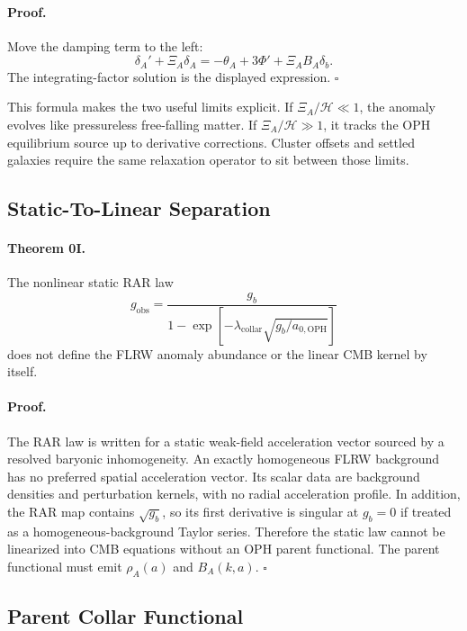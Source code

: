 \documentclass[11pt]{article}
\newcommand{\aoph}{a_{0,\mathrm{OPH}}}
\newcommand{\lambdac}{\lambda_{\mathrm{collar}}}
\begin{document}
\paragraph{Proof.}
Move the damping term to the left:
\begin{equation}
  \delta_A' + \Xi_A\delta_A
  =
  -\theta_A+3\Phi' + \Xi_A B_A\delta_b.
\end{equation}
The integrating-factor solution is the displayed expression. \(\square\)

This formula makes the two useful limits explicit.  If
\(\Xi_A/\mathcal H\ll1\), the anomaly evolves like pressureless free-falling
matter.  If \(\Xi_A/\mathcal H\gg1\), it tracks the OPH equilibrium source up
to derivative corrections.  Cluster offsets and settled galaxies require the
same relaxation operator to sit between those limits.

\subsection{Static-To-Linear Separation}

\paragraph{Theorem 0I.}
The nonlinear static RAR law
\begin{equation}
  g_{\mathrm{obs}}
  =
  \frac{g_b}{1-\exp[-\lambdac\sqrt{g_b/\aoph}]}
\end{equation}
does not define the FLRW anomaly abundance or the linear CMB kernel by itself.

\paragraph{Proof.}
The RAR law is written for a static weak-field acceleration vector sourced by a
resolved baryonic inhomogeneity.  An exactly homogeneous FLRW background has no
preferred spatial acceleration vector.  Its scalar data are background
densities and perturbation kernels, with no radial acceleration profile.  In
addition, the RAR map contains \(\sqrt{g_b}\), so its first derivative is
singular at \(g_b=0\) if treated as a homogeneous-background Taylor series.
Therefore the static law cannot be linearized into CMB equations without an
OPH parent functional.  The parent functional must emit \(\rho_A(a)\) and
\(B_A(k,a)\). \(\square\)

\subsection{Parent Collar Functional}
\end{document}
